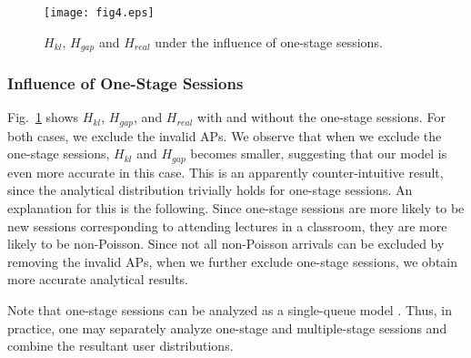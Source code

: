 \begin{figure}[tbp]
\centering
\texttt{[image: fig4.eps]}
\caption{$H_{kl}$, $H_{gap}$ and $H_{real}$ under the influence of one-stage sessions.}
\label{result4}
\end{figure}

\subsubsection{Influence of One-Stage Sessions}
Fig.~\ref{result4} shows $H_{kl}$, $H_{gap}$, and $H_{real}$ with and without the one-stage sessions. For both cases, we exclude the invalid APs.
We observe that when we exclude the one-stage sessions, $H_{kl}$ and $H_{gap}$ becomes smaller, suggesting that our model is even more accurate in this case.  This is an apparently counter-intuitive result, since the analytical distribution trivially holds for one-stage sessions.  An explanation for this is the following. Since one-stage sessions are more likely to be new sessions corresponding to attending lectures in a classroom, they are more likely to be non-Poisson.  Since not all non-Poisson arrivals can be excluded by removing the invalid APs, when we further exclude one-stage sessions, we obtain more accurate analytical results.



Note that one-stage sessions can be analyzed as a single-queue model \cite{Mobility-Core4}. Thus, in practice, one may separately analyze one-stage and multiple-stage sessions and combine the resultant user distributions.


